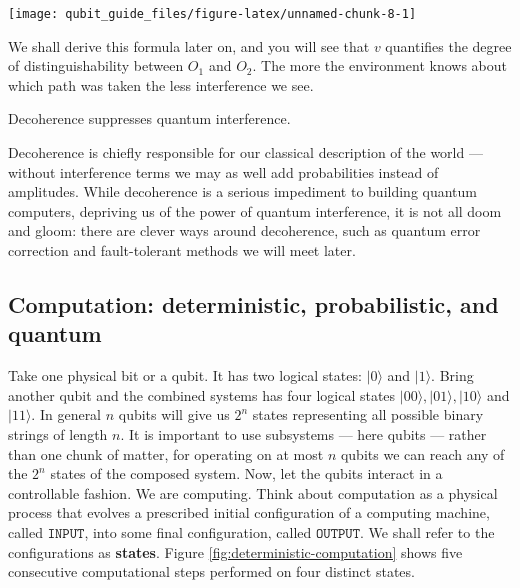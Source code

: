 \documentclass[fleqn]{article}
\newenvironment{idea}{\noindent}{\medskip}
\begin{document}
\begin{center}\texttt{[image: qubit\_guide\_files/figure-latex/unnamed-chunk-8-1]} \end{center}

We shall derive this formula later on, and you will see that \(v\) quantifies the degree of distinguishability between \(O_1\) and \(O_2\).
The more the environment knows about which path was taken the less interference we see.

\begin{idea}
Decoherence suppresses quantum interference.

\end{idea}

Decoherence is chiefly responsible for our classical description of the world --- without interference terms we may as well add probabilities instead of amplitudes.
While decoherence is a serious impediment to building quantum computers, depriving us of the power of quantum interference, it is not all doom and gloom: there are clever ways around decoherence, such as quantum error correction and fault-tolerant methods we will meet later.

\hypertarget{computation-deterministic-probabilistic-and-quantum}{%
\subsection{Computation: deterministic, probabilistic, and quantum}\label{computation-deterministic-probabilistic-and-quantum}}

Take one physical bit or a qubit.
It has two logical states: \(|0\rangle\) and \(|1\rangle\).
Bring another qubit and the combined systems has four logical states \(|00\rangle, |01\rangle,|10\rangle\) and \(|11\rangle\).
In general \(n\) qubits will give us \(2^n\) states representing all possible binary strings of length \(n\).
It is important to use subsystems --- here qubits --- rather than one chunk of matter, for operating on at most \(n\) qubits we can reach any of the \(2^n\) states of the composed system.
Now, let the qubits interact in a controllable fashion.
We are computing.
Think about computation as a physical process that evolves a prescribed initial configuration of a computing machine, called \textbf{\(\texttt{INPUT}\)}, into some final configuration, called \textbf{\(\texttt{OUTPUT}\)}.
We shall refer to the configurations as \textbf{states}.
Figure \ref{fig:deterministic-computation} shows five consecutive computational steps performed on four distinct states.
\end{document}
